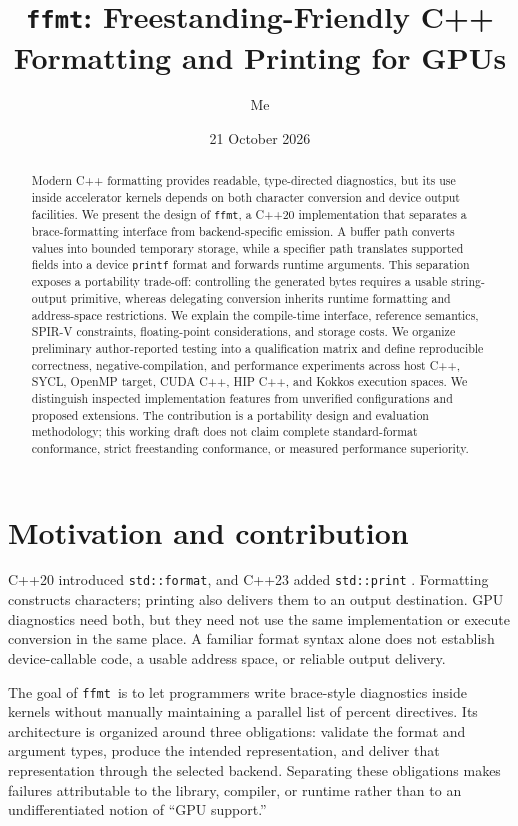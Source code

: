 \documentclass[11pt,letterpaper]{article}
\title{\texttt{ffmt}: Freestanding-Friendly C++\\Formatting and Printing for GPUs}
\author{Me}
\date{21 October 2026}
\newcommand{\ffmt}{\texttt{ffmt}}
\begin{document}
\maketitle
\thispagestyle{plain}

\begin{abstract}
Modern C++ formatting provides readable, type-directed diagnostics, but its use
inside accelerator kernels depends on both character conversion and device
output facilities. We present the design of \ffmt, a C++20 implementation
that separates a brace-formatting interface from backend-specific emission.
A buffer path converts values into bounded temporary storage, while a
specifier path translates supported fields into a device \texttt{printf}
format and forwards runtime arguments. This separation exposes a portability
trade-off: controlling the generated bytes requires a usable string-output
primitive, whereas delegating conversion inherits runtime formatting and
address-space restrictions. We explain the compile-time interface, reference
semantics, SPIR-V constraints, floating-point considerations, and storage costs.
We organize preliminary author-reported testing into a qualification matrix
and define reproducible correctness, negative-compilation, and performance
experiments across host C++, SYCL, OpenMP target, CUDA C++, HIP C++, and Kokkos
execution spaces. We distinguish inspected implementation features from
unverified configurations and proposed extensions. The contribution is a
portability design and evaluation methodology; this working draft does not
claim complete standard-format conformance, strict freestanding conformance,
or measured performance superiority.
\end{abstract}

\section{Motivation and contribution}

C++20 introduced \texttt{std::format}, and C++23 added \texttt{std::print}
\cite{format-intro,print-intro}. Formatting constructs characters; printing
also delivers them to an output destination. GPU diagnostics need both, but
they need not use the same implementation or execute conversion in the same
place. A familiar format syntax alone does not establish device-callable
code, a usable address space, or reliable output delivery.

The goal of \ffmt\ is to let programmers write brace-style diagnostics inside
kernels without manually maintaining a parallel list of percent directives.
Its architecture is organized around three obligations: validate the format
and argument types, produce the intended representation, and deliver that
representation through the selected backend. Separating these obligations
makes failures attributable to the library, compiler, or runtime rather than
to an undifferentiated notion of ``GPU support.''
\end{document}

